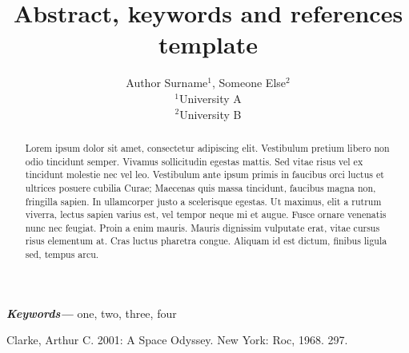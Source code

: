 \documentclass[a4paper]{article}
\title{Abstract, keywords and references template}
\author{Author Surname$^{1}$, Someone Else$^{2}$  \\
        \small $^{1}$University A \\
        \small $^{2}$University B \\
}
\date{} %
\providecommand{\keywords}[1]
{
  \small	
  \textbf{\textit{Keywords---}} #1
}
\begin{document}
\maketitle

\begin{abstract}
Lorem ipsum dolor sit amet, consectetur adipiscing elit. Vestibulum pretium libero non odio tincidunt semper. Vivamus sollicitudin egestas mattis. Sed vitae risus vel ex tincidunt molestie nec vel leo. Vestibulum ante ipsum primis in faucibus orci luctus et ultrices posuere cubilia Curae; Maecenas quis massa tincidunt, faucibus magna non, fringilla sapien. In ullamcorper justo a scelerisque egestas. Ut maximus, elit a rutrum viverra, lectus sapien varius est, vel tempor neque mi et augue. Fusce ornare venenatis nunc nec feugiat. Proin a enim mauris. Mauris dignissim vulputate erat, vitae cursus risus elementum at. Cras luctus pharetra congue. Aliquam id est dictum, finibus ligula sed, tempus arcu. 
\end{abstract} \hspace{10pt}

\keywords{one, two, three, four}
\begin{thebibliography}{00}
 Clarke, Arthur C. 2001: A Space Odyssey. New York: Roc, 1968. 297.
\end{thebibliography}


\end{document}
